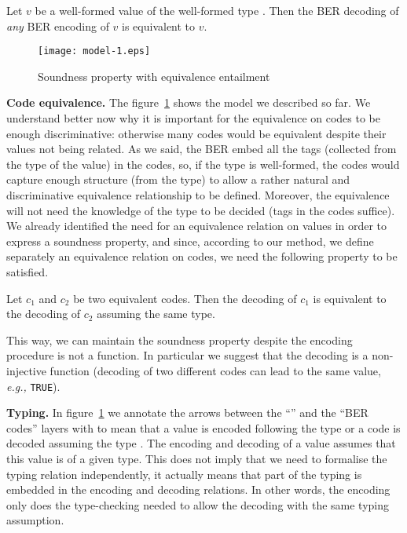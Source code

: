 \begin{theorem}[Soundness]\label{soundness}
Let $v$ be a well-formed value of the well-formed type \T. Then the
BER decoding of \emph{any} BER encoding of $v$ is equivalent to $v$.
\end{theorem}

\begin{figure}[htbp]
  \centerline{\texttt{[image: model-1.eps]}}
  \caption{\footnotesize Soundness property with equivalence entailment}
  \label{model1}
\end{figure}

\textbf{Code equivalence.} The figure~\ref{model1} shows the model we
described so far. We understand better now why it is important for the
equivalence on codes to be enough discriminative: otherwise many codes
would be equivalent despite their \ASN values not being related. As we
said, the BER embed all the tags (collected from the type of the
value) in the codes, so, if the type is well-formed, the codes would
capture enough structure (from the type) to allow a rather natural and
discriminative equivalence relationship to be defined. Moreover, the
equivalence will not need the knowledge of the type to be decided
(tags in the codes suffice). We already identified the need for an
equivalence relation on \ASN values in order to express a soundness
property, and since, according to our method, we define separately an
equivalence relation on codes, we need the following property to be
satisfied.

\begin{proposition}\hspace*{-4pt}\label{entailment}
Let $c_1$ and $c_2$ be two equivalent codes. Then the decoding of
$c_1$ is equivalent to the decoding of $c_2$ assuming the same type.
\end{proposition}

This way, we can maintain the soundness property despite the encoding
procedure is not a function. In particular we suggest that the
decoding is a non-injective function (decoding of two different codes
can lead to the same value, \emph{e.g.,} \texttt{TRUE}).

\medskip

\textbf{Typing.} In figure~\ref{model1} we annotate the arrows between
the ``\ASN'' and the ``BER codes'' layers with \T{} to mean that a value
is encoded following the type \T{} or a code is decoded assuming the
type \T. The encoding and decoding of a value assumes that this value
is of a given type. This does not imply that we need to formalise the
typing relation independently, it actually means that part of the
typing is embedded in the encoding and decoding relations. In other
words, the encoding only does the type-checking needed to allow the
decoding with the same typing assumption.

